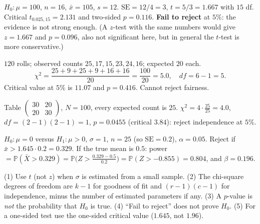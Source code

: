 \documentclass[11pt,a4paper]{article}
\renewcommand{\Pr}{\mathbb{P}}
\begin{document}
\begin{example}
$H_0:\mu=100$, $n=16$, $\bar x=105$, $s=12$. $\mathrm{SE}=12/4=3$, $t=5/3=1.667$ with $15$ df. Critical $t_{0.025,15}=2.131$ and two-sided $p=0.116$. \textbf{Fail to reject} at $5\%$: the evidence is not strong enough. (A $z$-test with the same numbers would give $z=1.667$ and $p=0.096$, also not significant here, but in general the $t$-test is more conservative.)
\end{example}
\begin{example}
$120$ rolls; observed counts $25,17,15,23,24,16$; expected $20$ each.
\[\chi^2=\frac{25+9+25+9+16+16}{20}=\frac{100}{20}=5.0,\quad df=6-1=5.\]
Critical value at $5\%$ is $11.07$ and $p=0.416$. Cannot reject fairness.
\end{example}
\begin{example}
Table $\begin{pmatrix}30&20\\20&30\end{pmatrix}$, $N=100$, every expected count is $25$. $\chi^2=4\cdot\frac{25}{25}=4.0$, $df=(2-1)(2-1)=1$, $p=0.0455$ (critical $3.84$): reject independence at $5\%$.
\end{example}
\begin{example}
$H_0:\mu=0$ versus $H_1:\mu>0$, $\sigma=1$, $n=25$ (so $\mathrm{SE}=0.2$), $\alpha=0.05$. Reject if $\bar x>1.645\cdot0.2=0.329$. If the true mean is $0.5$: power $=\Pr(\bar X>0.329)=\Pr\bigl(Z>\tfrac{0.329-0.5}{0.2}\bigr)=\Pr(Z>-0.855)=\mathbf{0.804}$, and $\beta=0.196$.
\end{example}
\begin{trap}
(1) Use $t$ (not $z$) when $\sigma$ is estimated from a small sample. (2) The chi-square degrees of freedom are $k-1$ for goodness of fit and $(r-1)(c-1)$ for independence, minus the number of estimated parameters if any. (3) A $p$-value is \emph{not} the probability that $H_0$ is true. (4) ``Fail to reject'' does not prove $H_0$. (5) For a one-sided test use the one-sided critical value ($1.645$, not $1.96$).
\end{trap}
\end{document}
